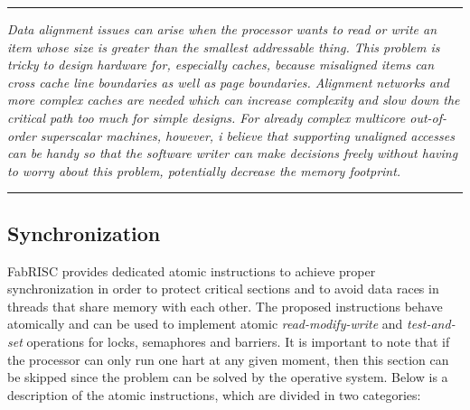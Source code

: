 \documentclass{article}
\begin{document}
        \par\noindent\rule{\textwidth}{0.4pt}
        \textit{Data alignment issues can arise when the processor wants to read or write an item whose size is greater than the smallest addressable thing. This problem is tricky to design hardware for, especially caches, because misaligned items can cross cache line boundaries as well as page boundaries. Alignment networks and more complex caches are needed which can increase complexity and slow down the critical path too much for simple designs. For already complex multicore out-of-order superscalar machines, however, i believe that supporting unaligned accesses can be handy so that the software writer can make decisions freely without having to worry about this problem, potentially decrease the memory footprint.}
        \par\noindent\rule{\textwidth}{0.4pt}

        \subsection{Synchronization}

            FabRISC provides dedicated atomic instructions to achieve proper synchronization in order to protect critical sections and to avoid data races in threads that share memory with each other. The proposed instructions behave atomically and can be used to implement atomic \textit{read-modify-write} and \textit{test-and-set} operations for locks, semaphores and barriers. It is important to note that if the processor can only run one hart at any given moment, then this section can be skipped since the problem can be solved by the operative system. Below is a description of the atomic instructions, which are divided in two categories:
\end{document}
